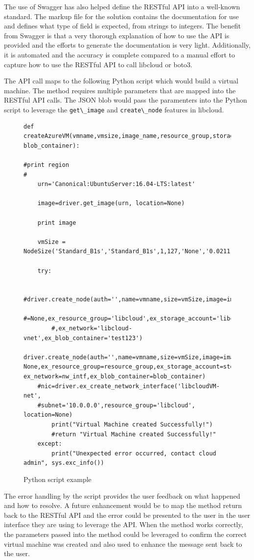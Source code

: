 The use of Swagger has also helped define the RESTful API into a well-known
standard. The markup file for the solution contains the documentation for use
and defines what type of field is expected, from strings to integers. The
benefit from Swagger is that a very thorough explanation of how to use the API
is provided and the efforts to generate the documentation is very light.
Additionally, it is automated and the accuracy is complete compared to a manual
effort to capture how to use the RESTful API to call libcloud or boto3.

The API call maps to the following Python script which would build a virtual
machine. The method requires multiple parameters that are mapped into the
RESTful API calls. The JSON blob would pass the paramenters into the Python
script to leverage the \verb|get\_image| and \verb|create\_node| features in
libcloud.

\begin{figure}[htb]
\begin{verbatim}
def
createAzureVM(vmname,vmsize,image_name,resource_group,storage_account,nw_intf,
blob_container): 

#print region
#
	urn='Canonical:UbuntuServer:16.04-LTS:latest'

	image=driver.get_image(urn, location=None)

	print image

	vmSize =
NodeSize('Standard_B1s','Standard_B1s',1,127,'None','0.0211',1,'Shared')

	try:

		#driver.create_node(auth='',name=vmname,size=vmSize,image=image,location
		#=None,ex_resource_group='libcloud',ex_storage_account='libclouddiag209'
		#,ex_network='libcloud-vnet',ex_blob_container='test123')
		driver.create_node(auth='',name=vmname,size=vmSize,image=image,location=
None,ex_resource_group=resource_group,ex_storage_account=storage_account,
ex_network=nw_intf,ex_blob_container=blob_container)
	#nic=driver.ex_create_network_interface('libcloudVM-net',
	#subnet='10.0.0.0',resource_group='libcloud', location=None)
		print("Virtual Machine created Successfully!")
		#return "Virtual Machine created Successfully!"
	except:
		print("Unexpected error occurred, contact cloud admin", sys.exc_info())
\end{verbatim}

\caption{Python script example}\label{c:Python-example}
\end{figure}

The error handling by the script provides the user feedback on what happened and
how to resolve. A future enhancement would be to map the method return back to
the RESTful API and the error could be presented to the user in the user
interface they are using to leverage the API. When the method works correctly,
the parameters passed into the method could be leveraged to confirm the correct
virtual machine was created and also used to enhance the message sent back to
the user.

